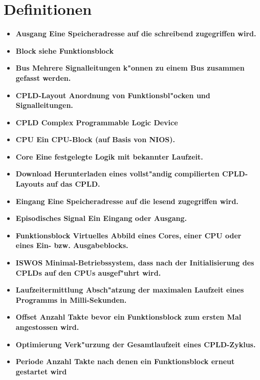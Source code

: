 \newcommand{\begriff}[2]
{\item \bfseries{#1} \textnormal{#2}}

\chapter {Definitionen}
\begin{itemize}

\begriff{Ausgang}{Eine Speicheradresse auf die schreibend zugegriffen
  wird.}

\begriff{Block}{siehe Funktionsblock}

\begriff{Bus}{Mehrere Signalleitungen k"onnen zu einem Bus zusammen
  gefasst werden.}

\begriff{CPLD-Layout}{Anordnung von Funktionsbl"ocken und Signalleitungen.}

\begriff{CPLD}{Complex Programmable Logic Device}

\begriff{CPU}{Ein CPU-Block (auf Basis von NIOS).}

\begriff{Core}{Eine festgelegte Logik mit bekannter Laufzeit.}

\begriff{Download}{Herunterladen eines vollst"andig compilierten CPLD-Layouts
auf das CPLD.}

\begriff{Eingang}{Eine Speicheradresse auf die lesend zugegriffen wird.}

\begriff{Episodisches Signal}{Ein Eingang oder Ausgang.}

\begriff{Funktionsblock}{Virtuelles Abbild eines Cores, einer CPU oder
eines Ein- bzw. Ausgabeblocks.}

\begriff{ISWOS}{Minimal-Betriebssystem, dass nach der Initialisierung
  des CPLDs auf den CPUs ausgef"uhrt wird.}

\begriff{Laufzeitermittlung}{Absch"atzung der maximalen Laufzeit eines
  Programms in Milli-Sekunden.}

\begriff{Offset}{Anzahl Takte bevor ein Funktionsblock zum ersten Mal
  angestossen wird.}

\begriff{Optimierung}{Verk"urzung der Gesamtlaufzeit eines CPLD-Zyklus.}

\begriff{Periode}{Anzahl Takte nach denen ein Funktionsblock erneut
  gestartet wird}


\end{itemize}
